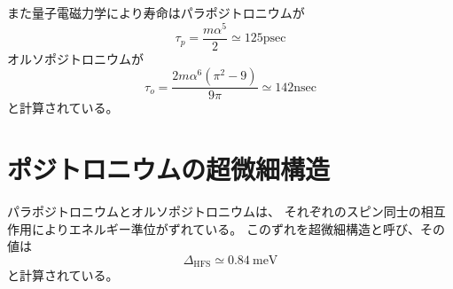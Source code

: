また量子電磁力学により寿命はパラポジトロニウムが
\begin{equation}
\tau_{p} = \frac{m \alpha^{5}}{2} \simeq 125 \mathrm{psec}
\end{equation}
オルソポジトロニウムが
\begin{equation}
\tau_{o} = \frac{2m \alpha^{6}(\pi^{2}-9)}{9 \pi} \simeq 142 \mathrm{nsec}
\end{equation}
と計算されている。


\section{ポジトロニウムの超微細構造}

パラポジトロニウムとオルソポジトロニウムは、
それぞれのスピン同士の相互作用によりエネルギー準位がずれている。
このずれを超微細構造と呼び、その値は
\begin{equation}
\Delta_{\mathrm{HFS}} \simeq 0.84\ \mathrm{meV}
\end{equation}
と計算されている。


